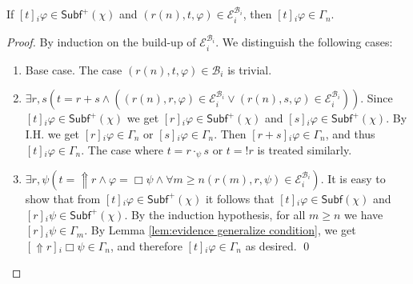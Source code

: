 \documentclass[envcountsect,envcountsame,oribibl,orivec]{llncs}
\newcommand{\lalways}{\Box}
\newcommand{\jbox}[1]{\left[#1\right]\!}
\newcommand{\tgeneralize}{\Uparrow}
\newcommand{\evidence}{\mathcal{E}}
\renewcommand{\phi}{\varphi}
\newcommand{\Subf}{\mathsf{Subf}}
\newcommand{\B}{\mathcal{B}}
\begin{document}
\begin{lemma}\label{lem:fixed-point implies base}
	If $\jbox{t}_i \phi \in \Subf^+ (\chi)$ and $(r(n),t,\phi) \in \evidence_i^{\mathcal{B}_i}$, then $\jbox{t}_i \phi \in \Gamma_{n}$. 
\end{lemma}
\begin{proof}
	By induction on the build-up of $\evidence_i^{\B_i}$. We distinguish the following cases:
	
	\begin{enumerate}
		\item Base case. The case $(r(n),t,\phi) \in \mathcal{B}_i$ is trivial.
		
		\item $\exists r, s (t=r+s \land ( (r(n),r,\phi) \in \evidence_i^{\B_i} \lor   (r(n),s,\phi) \in \evidence_i^{\B_i} ))$. Since $\jbox{t}_i \phi \in \Subf^+ (\chi)$  we get $\jbox{r}_i \phi \in \Subf^+ (\chi)$ and $\jbox{s}_i \phi \in \Subf^+ (\chi)$. By I.H. we get $\jbox{r}_i \phi \in \Gamma_n$ or $\jbox{s}_i \phi \in \Gamma_n$. Then $\jbox{r+s}_i \phi \in \Gamma_n$, and thus $\jbox{t}_i \phi \in \Gamma_{n}$. The case where $t = r \cdot_\psi s$ or $t = !r$ is treated similarly.
	
		
		\item $\exists r,\psi ( t = \tgeneralize r \land \phi = \lalways \psi \land \forall m \geq n (r(m),r,\psi) \in \evidence_i^{\mathcal{B}_i})$. It is easy to show that from $\jbox{t}_i \phi \in \Subf^+ (\chi)$ it follows that $\jbox{t}_i \phi \in \Subf (\chi)$ and $\jbox{r}_i \psi \in \Subf^+ (\chi)$. By the induction hypothesis, for all $m \geq n$ we have $\jbox{r}_i \psi \in \Gamma_m$. By Lemma \ref{lem:evidence generalize condition}, we get $ \jbox{\tgeneralize r}_i \lalways \psi \in \Gamma_n$, and therefore  $\jbox{t}_i \phi \in \Gamma_{n}$ as desired. \qed
	\end{enumerate}
\end{proof}
\end{document}
